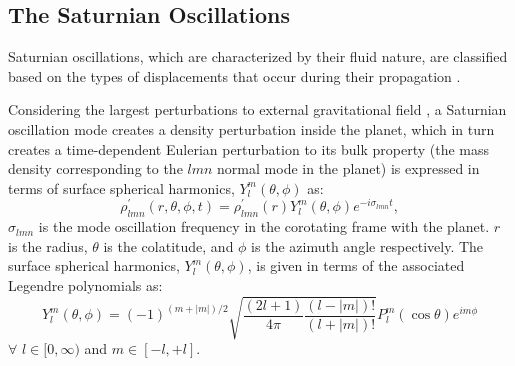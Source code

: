 \documentclass{article}
\begin{document}
\subsection{The Saturnian Oscillations}
Saturnian oscillations, which are characterized by their fluid nature, are classified based on the types of displacements that occur during their propagation \cite{Marley1993PlanetaryAM}. 

Considering the largest perturbations to external gravitational field \cite{article, Mankovich_2019, Marley1993PlanetaryAM}, a Saturnian oscillation mode creates a density perturbation inside the planet, which in turn creates a time-dependent Eulerian perturbation to its bulk property (the mass density corresponding
to the $lmn$ normal mode in the planet) is expressed in terms of surface spherical harmonics, $Y_{l}^{m}(\theta,\phi)$ as: 
\begin{equation}
    \rho_{lmn}^{'}(r,\theta,\phi,t) =   \rho_{lmn}^{'}(r)Y_{l}^{m}(\theta,\phi)e^{-i\sigma_{lmn}t},
\end{equation}
$\sigma_{lmn}$ is the mode oscillation frequency in the corotating frame with the planet. $r$ is the radius, $\theta$ is the colatitude, and $\phi$ is the azimuth angle respectively. The surface spherical harmonics, $Y_{l}^{m}(\theta,\phi)$, is given in terms of the associated Legendre polynomials as: 
\begin{equation}
     Y_{l}^{m}(\theta,\phi) = (-1)^{(m+|m|)/2} \sqrt{\frac{(2l+1)}{4\pi}\frac{(l-|m|)!}{(l+|m|)!}}P^{m}_{l} (\cos\theta)e^{im\phi}
\end{equation}
$\forall$  $l \in [0, \infty)$ and $m \in [-l,+l]$.
\end{document}
